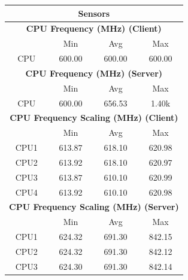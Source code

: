 \documentclass[11pt,a4paper,headinclude=false,footinclude=false]{scrreprt}
\begin{document}
\begin{table}[H]
\centering
    \begin{tabular}{||c|c|c|c|c|c|c||}
    \hline
    \multicolumn{7}{|c|}{\textbf{Sensors}} \\
    \hline
    \multicolumn{7}{|c|}{\textbf{CPU Frequency (MHz) (Client)}} \\
    \hline\hline
      & \multicolumn{2}{|c|}{Min} & \multicolumn{2}{|c|}{Avg} & \multicolumn{2}{|c|}{Max} \\
    \hline
    CPU & \multicolumn{2}{|c|}{600.00} & \multicolumn{2}{|c|}{600.00} & \multicolumn{2}{|c|}{600.00} \\
    \hline\hline
    \multicolumn{7}{|c|}{\textbf{CPU Frequency (MHz) (Server)}} \\
    \hline\hline
      & \multicolumn{2}{|c|}{Min} & \multicolumn{2}{|c|}{Avg} & \multicolumn{2}{|c|}{Max} \\
    \hline
    CPU & \multicolumn{2}{|c|}{600.00} & \multicolumn{2}{|c|}{656.53} & \multicolumn{2}{|c|}{1.40k} \\
    \hline\hline
    \multicolumn{7}{|c|}{\textbf{CPU Frequency Scaling (MHz) (Client)}} \\
    \hline
      & \multicolumn{2}{|c|}{Min} & \multicolumn{2}{|c|}{Avg} & \multicolumn{2}{|c|}{Max} \\
    \hline
    CPU1 & \multicolumn{2}{|c|}{613.87} & \multicolumn{2}{|c|}{618.10} & \multicolumn{2}{|c|}{620.98} \\
    \hline
    CPU2 & \multicolumn{2}{|c|}{613.92} & \multicolumn{2}{|c|}{618.10} & \multicolumn{2}{|c|}{620.97} \\
    \hline
    CPU3 & \multicolumn{2}{|c|}{613.87} & \multicolumn{2}{|c|}{610.10} & \multicolumn{2}{|c|}{620.99} \\
    \hline
    CPU4 & \multicolumn{2}{|c|}{613.92} & \multicolumn{2}{|c|}{610.10} & \multicolumn{2}{|c|}{620.98} \\
    \hline\hline
    \multicolumn{7}{|c|}{\textbf{CPU Frequency Scaling (MHz) (Server)}} \\
    \hline
      & \multicolumn{2}{|c|}{Min} & \multicolumn{2}{|c|}{Avg} & \multicolumn{2}{|c|}{Max} \\
    \hline
    CPU1 & \multicolumn{2}{|c|}{624.32} & \multicolumn{2}{|c|}{691.30} & \multicolumn{2}{|c|}{842.15} \\
    \hline
    CPU2 & \multicolumn{2}{|c|}{624.32} & \multicolumn{2}{|c|}{691.30} & \multicolumn{2}{|c|}{842.12} \\
    \hline
    CPU3 & \multicolumn{2}{|c|}{624.30} & \multicolumn{2}{|c|}{691.30} & \multicolumn{2}{|c|}{842.14} \\

\end{tabular}
\end{table}
\end{document}
